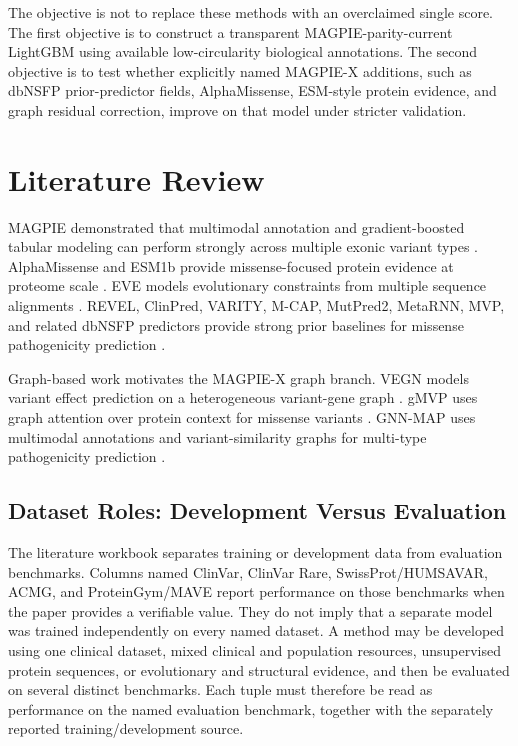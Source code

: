 \documentclass[conference]{IEEEtran}
\begin{document}
The objective is not to replace these methods with an overclaimed single score. The first objective is to construct a transparent MAGPIE-parity-current LightGBM using available low-circularity biological annotations. The second objective is to test whether explicitly named MAGPIE-X additions, such as dbNSFP prior-predictor fields, AlphaMissense, ESM-style protein evidence, and graph residual correction, improve on that model under stricter validation.

\section{Literature Review}
MAGPIE demonstrated that multimodal annotation and gradient-boosted tabular modeling can perform strongly across multiple exonic variant types \cite{liu2024magpie}. AlphaMissense and ESM1b provide missense-focused protein evidence at proteome scale \cite{cheng2023alphamissense,brandes2023esm1b}. EVE models evolutionary constraints from multiple sequence alignments \cite{frazer2021eve}. REVEL, ClinPred, VARITY, M-CAP, MutPred2, MetaRNN, MVP, and related dbNSFP predictors provide strong prior baselines for missense pathogenicity prediction \cite{ioannidis2016revel,alirezaie2018clinpred,wu2021varity,jagadeesh2016mcap,pevzner2020mutpred2,li2022metarnn,qi2021mvp}.

Graph-based work motivates the MAGPIE-X graph branch. VEGN models variant effect prediction on a heterogeneous variant-gene graph \cite{cheng2021vegn}. gMVP uses graph attention over protein context for missense variants \cite{zhang2022gmvp}. GNN-MAP uses multimodal annotations and variant-similarity graphs for multi-type pathogenicity prediction \cite{yu2025gnnmap}.

\subsection{Dataset Roles: Development Versus Evaluation}
The literature workbook separates training or development data from evaluation benchmarks. Columns named ClinVar, ClinVar Rare, SwissProt/HUMSAVAR, ACMG, and ProteinGym/MAVE report performance on those benchmarks when the paper provides a verifiable value. They do not imply that a separate model was trained independently on every named dataset. A method may be developed using one clinical dataset, mixed clinical and population resources, unsupervised protein sequences, or evolutionary and structural evidence, and then be evaluated on several distinct benchmarks. Each tuple must therefore be read as performance on the named evaluation benchmark, together with the separately reported training/development source.
\end{document}
